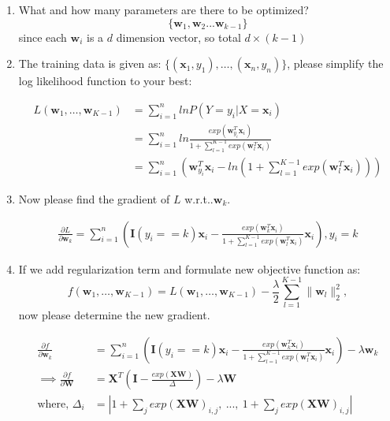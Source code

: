 \documentclass[11pt]{article}
\makeatletter
\newcommand{\mtx}[1]{\mathbf{#1}}
\newcommand{\vct}[1]{\mathbf{#1}}
\def \mI {\mtx{I}}
\def \mW {\mtx{W}}
\def \mX {\mtx{X}}
\def \vw {\vct{w}}
\def \vx {\vct{x}}
\DeclareRobustCommand\onedot{\futurelet\@let@token\@onedot}
\def\@onedot{\ifx\@let@token.\else.\null\fi\xspace}
\def\wrt{w.r.t\onedot} \def\dof{d.o.f\onedot}
\makeatother
\begin{document}
\begin{enumerate}
	\item What and how many parameters are there to be optimized? 
		$$ \{\vw_1,\vw_2 ... \vw_{k-1}\}$$ since each $\vw_i$ is a $d$ dimension vector,
		so total $d\times(k-1)$
	\item The training data is given as: $\{(\vx_1,y_1),\dots,(\vx_n,y_n)\}$, please simplify the log likelihood function to your best:

	\begin{align}
		L(\vw_1,\dots,\vw_{K-1})&=\sum\limits_{i=1}^n ln P(Y=y_i|X=\vx_i)\\
		&=\sum\limits_{i=1}^n ln \frac{exp(\vw_{y_i}^T\vx_i)}{1+\sum\limits_{l=1}^{K-1}exp(\vw_{l}^T\vx_i)}\\
		& = \sum\limits_{i=1}^n (\vw_{y_i}^T\vx_i - ln (1+\sum\limits_{l=1}^{K-1}exp(\vw_{l}^T\vx_i)))
	\end{align}


	\item Now please find the gradient of $L$ \wrt $\vw_k$.
	
	\begin{align}
		\frac{\partial L}{\partial \vw_k} = \sum\limits_{i=1}^n ( \mI(y_i==k)\vx_i -\frac{exp(\vw_k^T\vx_i)}{1+\sum\limits_{l=1}^{K-1}exp(\vw_{l}^T\vx_i)}\vx_i), y_i=k
	\end{align}


	\item If we add regularization term and formulate new objective function as:
	\begin{equation}\label{reg}
		f(\vw_1,\dots,\vw_{K-1})=L(\vw_1,\dots,\vw_{K-1})-\frac{\lambda}{2}\sum\limits_{l=1}^{K-1}\|\vw_l\|^2_2,
	\end{equation}
	now please determine the new gradient.
	
	\begin{align}
		\frac{\partial f}{\partial \vw_k} &= \sum\limits_{i=1}^n ( \mI(y_i==k)\vx_i -\frac{exp(\vw_k^T\vx_i)}{1+\sum\limits_{l=1}^{K-1}exp(\vw_{l}^T\vx_i)}\vx_i) - \lambda\vw_k\\
		\implies \frac{\partial f}{\partial \mW} &= \mX^T(\mI-\frac{exp(\mX\mW)}{\Delta})-\lambda \mW\\
		\text{where, } \Delta_i &= |1+\sum_j exp(\mX\mW)_{i,j},\  ... ,\  1+\sum_j exp(\mX\mW)_{i,j} |
	\end{align}
	

\end{enumerate}
\end{document}
